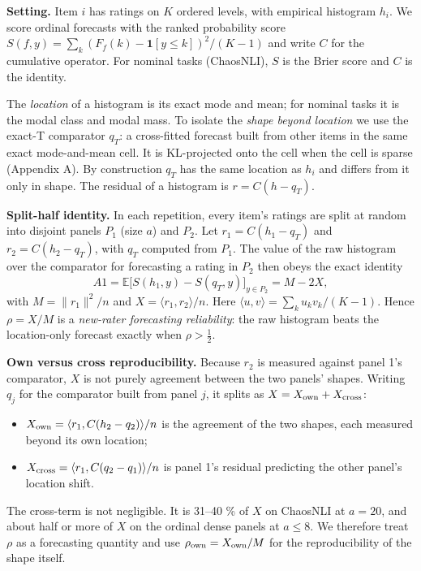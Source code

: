 \documentclass{article}
\providecommand{\tightlist}{\setlength{\itemsep}{0pt}\setlength{\parskip}{0pt}}
\begin{document}
\textbf{Setting.} Item \(i\) has ratings on \(K\) ordered levels, with empirical histogram \(h_i\). We score ordinal forecasts with the ranked probability score \(S(f,y)=\sum_k (F_f(k)-\mathbf 1[y\le k])^2/(K-1)\) and write \(C\) for the cumulative operator. For nominal tasks (ChaosNLI), \(S\) is the Brier score and \(C\) is the identity.

The \emph{location} of a histogram is its exact mode and mean; for nominal tasks it is the modal class and modal mass. To isolate the \emph{shape beyond location} we use the exact-T comparator \(q_T\): a cross-fitted forecast built from other items in the same exact mode-and-mean cell. It is KL-projected onto the cell when the cell is sparse (Appendix A). By construction \(q_T\) has the same location as \(h_i\) and differs from it only in shape. The residual of a histogram is \(r = C(h - q_T)\).

\textbf{Split-half identity.} In each repetition, every item's ratings are split at random into disjoint panels \(P_1\) (size \(a\)) and \(P_2\). Let \(r_1 = C(h_1-q_T)\) and \(r_2 = C(h_2-q_T)\), with \(q_T\) computed from \(P_1\). The value of the raw histogram over the comparator for forecasting a rating in \(P_2\) then obeys the exact identity \[A1 = \mathbb E\big[S(h_1,y)-S(q_T,y)\big]_{y\in P_2} = M - 2X,\] with \(M=\|r_1\|^2/n\) and \(X=\langle r_1,r_2\rangle/n\). Here \(\langle u,v\rangle=\sum_k u_k v_k/(K-1)\). Hence \(\rho = X/M\) is a \emph{new-rater forecasting reliability}: the raw histogram beats the location-only forecast exactly when \(\rho>\tfrac12\).

\textbf{Own versus cross reproducibility.} Because \(r_2\) is measured against panel 1's comparator, \(X\) is not purely agreement between the two panels' shapes. Writing \(q_j\) for the comparator built from panel \(j\), it splits as \(X = X_{\rm own} + X_{\rm cross}\):

\begin{itemize}
\tightlist
\item
  \(X_{\rm own}=\langle r_1, C(h_2-q_2)\rangle/n\) is the agreement of the two shapes, each measured beyond its own location;
\item
  \(X_{\rm cross}=\langle r_1, C(q_2-q_1)\rangle/n\) is panel 1's residual predicting the other panel's location shift.
\end{itemize}

The cross-term is not negligible. It is 31--40 \% of \(X\) on ChaosNLI at \(a=20\), and about half or more of \(X\) on the ordinal dense panels at \(a\le 8\). We therefore treat \(\rho\) as a forecasting quantity and use \(\rho_{\rm own}=X_{\rm own}/M\) for the reproducibility of the shape itself.
\end{document}
